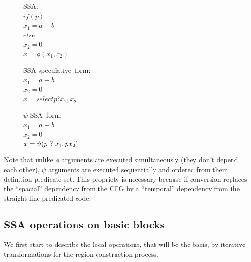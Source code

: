 \begin{figure}
\begin{minipage}[t]{4cm}
\mbox{SSA:} \\
$ if (p) $ \\
$   x_1 = a+b $ \\
$ else $ \\
$   x_2 = 0 $ \\
$ x = \phi (x_1, x_2) $ \\
\end{minipage}
\begin{minipage}[t]{4cm}
\mbox{SSA-speculative form:} \\
$x_1 = a + b $ \\
$x_2 = 0 $ \\
$x = select p ? x_1, x_2$ \\
\end{minipage}
\begin{minipage}[t]{4cm}
\mbox{$\psi$-SSA form:} \\
$x_1 = a + b $ \\
$x_2 = 0 $\\
$x = \psi (p ~?~ x_1, \overline{p} x_2) $ \\
\end{minipage}
\end{figure}

Note that unlike $\phi$ arguments are executed simultaneously (they don't depend each other), $\psi$ arguments are executed sequentially and ordered from their definition predicate set. This propriety is necessary because if-conversion replaces the ``spacial'' dependency from the CFG by a ``temporal'' dependency from the straight line predicated code.

\subsection{SSA operations on basic blocks}

We first start to describe the local operations, that will be the basis, by iterative transformations for the region construction process. 

